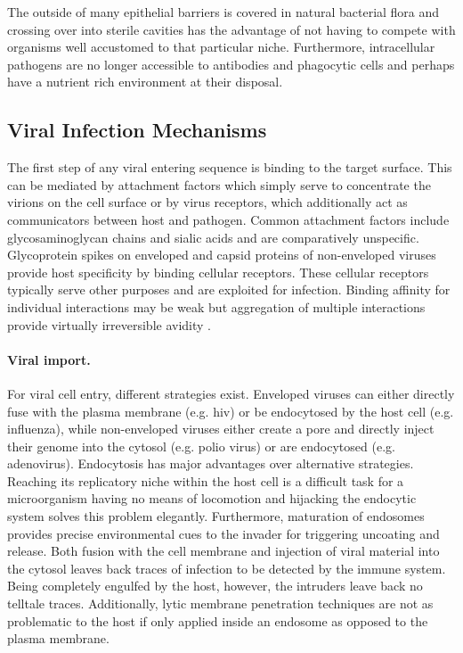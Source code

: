 The outside of many epithelial barriers is covered in natural bacterial flora and crossing over into sterile cavities has the advantage of not having to compete with organisms well accustomed to that particular niche. Furthermore, intracellular pathogens are no longer accessible to antibodies and phagocytic cells and perhaps have a nutrient rich environment at their disposal.

\subsection{Viral Infection Mechanisms}

The first step of any viral entering sequence is binding to the target surface. This can be mediated by attachment factors which simply serve to concentrate the virions on the cell surface or by virus receptors, which additionally act as communicators between host and pathogen. Common attachment factors include glycosaminoglycan chains and sialic acids and are comparatively unspecific. Glycoprotein spikes on enveloped and capsid proteins of non-enveloped viruses provide host specificity by binding cellular receptors. These cellular receptors typically serve other purposes and are exploited for infection. Binding affinity for individual interactions may be weak but aggregation of multiple interactions provide virtually irreversible avidity \citep{Smith2012}.

\paragraph{Viral import.}
For viral cell entry, different strategies exist. Enveloped viruses can either directly fuse with the plasma membrane (e.g. \gls{hiv}) or be endocytosed by the host cell (e.g. influenza), while non-enveloped viruses either create a pore and directly inject their genome into the cytosol (e.g. polio virus) or are endocytosed (e.g. adenovirus). Endocytosis has major advantages over alternative strategies. Reaching its replicatory niche within the host cell is a difficult task for a microorganism having no means of locomotion and hijacking the endocytic system solves this problem elegantly. Furthermore, maturation of endosomes provides precise environmental cues to the invader for triggering uncoating and release. Both fusion with the cell membrane and injection of viral material into the cytosol leaves back traces of infection to be detected by the immune system. Being completely engulfed by the host, however, the intruders leave back no telltale traces. Additionally, lytic membrane penetration techniques are not as problematic to the host if only applied inside an endosome as opposed to the plasma membrane.


